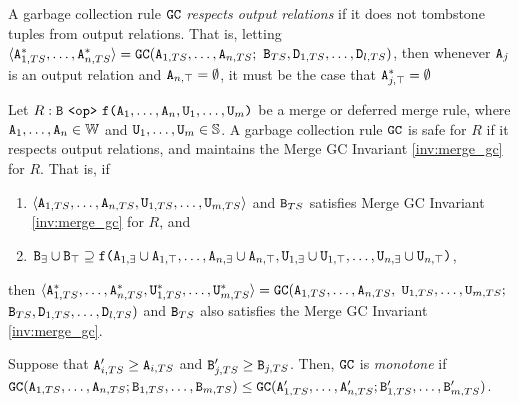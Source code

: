 \begin{property}
A garbage collection rule $\tt{GC}$ \emph{respects output relations} if it does not tombstone tuples from output relations.
That is, letting $\langle \tt{A}_{1,TS}^*, \dots, \tt{A}_{n,TS}^* \rangle = \tt{GC}(\tt{A}_{1,TS}, \dots, \tt{A}_{n,TS};$ $\tt{B}_{TS}, \tt{D}_{1,TS}, \dots, \tt{D}_{l,TS})$, then whenever $\tt{A}_j$ is an output relation and $\tt{A}_{n,\top} = \emptyset$, it must be the case that $\tt{A}_{j,\top}^* = \emptyset$
\end{property}

\begin{property}
\label{property:gc_safety}
Let $R: \tt{B} ~\tt{<op>}~ \tt{f(}\tt{A}_1,\dots,\tt{A}_n, \tt{U}_1, \dots, \tt{U}_m\tt{)}$ be a merge or deferred merge rule, where $\tt{A}_1, \dots, \tt{A}_n \in \mathbb{W}$ and $\tt{U}_1, \dots, \tt{U}_m \in \mathbb{S}$.
A garbage collection rule $\tt{GC}$ is safe for $R$ if it respects output relations, and maintains the Merge GC Invariant \ref{inv:merge_gc} for $R$.
That is, if
\begin{enumerate}
\item $\langle \tt{A}_{1,TS}, \dots, \tt{A}_{n,TS}, \tt{U}_{1,TS}, \dots, \tt{U}_{m,TS} \rangle$ and $\tt{B}_{TS}$ satisfies Merge GC Invariant \ref{inv:merge_gc} for $R$, and
\item $\tt{B}_\exists \cup \tt{B}_\top \supseteq \tt{f}\tt{(}\tt{A}_{1,\exists} \cup \tt{A}_{1,\top},\dots,\tt{A}_{n,\exists} \cup \tt{A}_{n,\top}, \tt{U}_{1,\exists} \cup \tt{U}_{1,\top},\dots,\tt{U}_{n,\exists} \cup \tt{U}_{n,\top}\tt{)}$,
\end{enumerate}
then $\langle \tt{A}_{1,TS}^*, \dots, \tt{A}_{n,TS}^*, \tt{U}_{1,TS}^*, \dots, \tt{U}_{m,TS}^* \rangle = \tt{GC}(\tt{A}_{1,TS}, \dots, \tt{A}_{n,TS},$ $\tt{U}_{1,TS}, \dots, \tt{U}_{m,TS};$ $\tt{B}_{TS}, \tt{D}_{1,TS}, \dots, \tt{D}_{l,TS})$ and $\tt{B}_{TS}$ also satisfies the Merge GC Invariant \ref{inv:merge_gc}.
\end{property}

\begin{property}[GC Rule Monotonicity]
Suppose that $\tt{A}'_{i,TS} \geq \tt{A}_{i,TS}$ and $\tt{B}'_{j,TS} \geq \tt{B}_{j,TS}$.
Then, $\tt{GC}$ is \emph{monotone} if $\tt{GC}(\tt{A}_{1,TS}, \dots, \tt{A}_{n,TS}; \tt{B}_{1,TS}, \dots, \tt{B}_{m,TS}) \leq \tt{GC}(\tt{A}'_{1,TS}, \dots, \tt{A}'_{n,TS}; \tt{B}'_{1,TS}, \dots, \tt{B}'_{m,TS})$.
\end{property}

